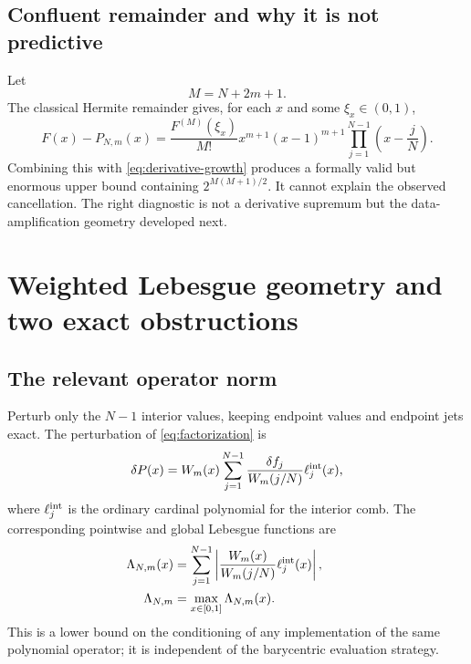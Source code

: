 \documentclass[11pt,oneside]{article}
\numberwithin{equation}{section}
\theoremstyle{definition}
\theoremstyle{remark}
\newcommand{\Leb}{\Lambda}
\begin{document}
\subsection{Confluent remainder and why it is not predictive}

Let
\begin{equation}
 M=N+2m+1.
\end{equation}
The classical Hermite remainder gives, for each $x$ and some $\xi_x\in(0,1)$,
\begin{equation}
 F(x)-P_{N,m}(x)=
 \frac{F^{(M)}(\xi_x)}{M!}
 x^{m+1}(x-1)^{m+1}
 \prod_{j=1}^{N-1}\left(x-\frac jN\right).
 \label{eq:hermite-remainder}
\end{equation}
Combining this with \eqref{eq:derivative-growth} produces a formally valid but enormous
upper bound containing $2^{M(M+1)/2}$.  It cannot explain the observed cancellation.  The
right diagnostic is not a derivative supremum but the data-amplification geometry developed
next.

\section{Weighted Lebesgue geometry and two exact obstructions}
\label{sec:conditioning}

\subsection{The relevant operator norm}

Perturb only the $N-1$ interior values, keeping endpoint values and endpoint jets exact.
The perturbation of \eqref{eq:factorization} is
\begin{equation}
 \delta P(x)=W_m(x)\sum_{j=1}^{N-1}
       \frac{\delta f_j}{W_m(j/N)}\ell_j^{\rm int}(x),
 \label{eq:perturbation}
\end{equation}
where $\ell_j^{\rm int}$ is the ordinary cardinal polynomial for the interior comb.  The
corresponding pointwise and global Lebesgue functions are
\begin{align}
 \Leb_{N,m}(x)&=
 \sum_{j=1}^{N-1}\left|
   \frac{W_m(x)}{W_m(j/N)}\ell_j^{\rm int}(x)
 \right|,
 \label{eq:weighted-lebesgue}\qquad\\
 \Leb_{N,m}&=\max_{x\in[0,1]}\Leb_{N,m}(x).
 \label{eq:weighted-lebesgue-global}
\end{align}
This is a lower bound on the conditioning of any implementation of the same polynomial
operator; it is independent of the barycentric evaluation strategy.
\end{document}
